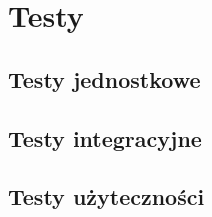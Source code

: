 \chapter{Testy}
\section{Testy jednostkowe}
\section{Testy integracyjne}
\section{Testy użyteczności}

\thispagestyle{normal}
